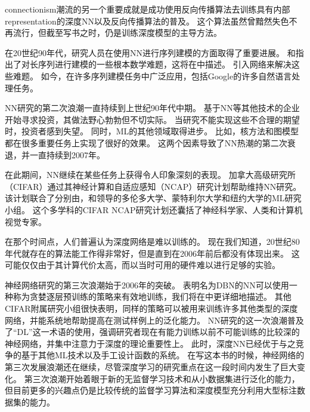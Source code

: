 
\gls{connectionism}潮流的另一个重要成就是成功使用反向传播算法去训练具有内部\gls{representation}的深度\gls{NN}以及反向传播算法的普及\citep{RHW,Lecun-these87}。
这个算法虽然曾黯然失色不再流行，但截至写书之时，仍是训练深度模型的主导方法。%

在20世纪90年代，研究人员在使用\gls{NN}进行序列建模的方面取得了重要进展。
\citet{Hochreiter91}和\citet{Bengio1994ITNN}指出了对长序列进行建模的一些根本数学难题，这将在中描述。
\citet{Hochreiter+Schmidhuber-1997}引入网络来解决这些难题。
如今，在许多序列建模任务中广泛应用，包括Google的许多自然语言处理任务。

\gls{NN}研究的第二次浪潮一直持续到上世纪90年代中期。
基于\gls{NN}等其他技术的企业开始寻求投资，其做法野心勃勃但不切实际。
当研究不能实现这些不合理的期望时，投资者感到失望。
同时，\gls{ML}的其他领域取得进步。
比如，核方法\citep{Boser92,Cortes95,SchBurSmo99}和图模型\citep{Jordan98}都在很多重要任务上实现了很好的效果。
这两个因素导致了\gls{NN}热潮的第二次衰退，并一直持续到2007年。

在此期间，\gls{NN}继续在某些任务上获得令人印象深刻的表现\citep{LeCun98-small,Bengio-nnlm2001}。
加拿大高级研究所（CIFAR）通过其神经计算和自适应感知（NCAP）研究计划帮助维持\gls{NN}研究。
该计划联合了分别由，和领导的多伦多大学、蒙特利尔大学和纽约大学的\gls{ML}研究小组。
这个多学科的CIFAR NCAP研究计划还囊括了神经科学家、人类和计算机视觉专家。


在那个时间点，人们普遍认为深度网络是难以训练的。
现在我们知道，20世纪80年代就存在的算法能工作得非常好，但是直到在2006年前后都没有体现出来。
这可能仅仅由于其计算代价太高，而以当时可用的硬件难以进行足够的实验。

神经网络研究的第三次浪潮始于2006年的突破。
表明名为\gls{DBN}的\gls{NN}可以使用一种称为贪婪逐层预训练的策略来有效地训练\citep{Hinton06}，我们将在中更详细地描述。
其他CIFAR附属研究小组很快表明，同样的策略可以被用来训练许多其他类型的深度网络\citep{Bengio+Lecun-chapter2007-small,ranzato-07}，并能系统地帮助提高在测试样例上的泛化能力。
\gls{NN}研究的这一次浪潮普及了``\gls{DL}''这一术语的使用，强调研究者现在有能力训练以前不可能训练的比较深的神经网络，并集中注意力于深度的理论重要性上\citep{Bengio+Lecun-chapter2007,Delalleau+Bengio-2011-small,Pascanu-et-al-ICLR2014,Montufar-et-al-NIPS2014}。
此时，深度\gls{NN}已经优于与之竞争的基于其他\gls{ML}技术以及手工设计函数的系统。
在写这本书的时候，神经网络的第三次发展浪潮还在继续，尽管深度学习的研究重点在这一段时间内发生了巨大变化。
第三次浪潮开始着眼于新的无监督学习技术和从小数据集进行泛化的能力，但目前更多的兴趣点仍是比较传统的监督学习算法和深度模型充分利用大型标注数据集的能力。

